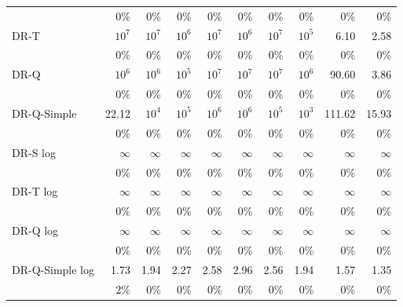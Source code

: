\begin{tabular}{l|rrrrrrrrr}
 & \scriptsize 0\% & \scriptsize 0\% & \scriptsize 0\% & \scriptsize 0\% & \scriptsize 0\% & \scriptsize 0\% & \scriptsize 0\% & \scriptsize 0\% & \scriptsize 0\% \\[2pt]
DR-T & $10^{7}$ & $10^{7}$ & $10^{6}$ & $10^{7}$ & $10^{6}$ & $10^{7}$ & $10^{5}$ & 6.10 & 2.58 \\
 & \scriptsize 0\% & \scriptsize 0\% & \scriptsize 0\% & \scriptsize 0\% & \scriptsize 0\% & \scriptsize 0\% & \scriptsize 0\% & \scriptsize 0\% & \scriptsize 0\% \\[2pt]
DR-Q & $10^{6}$ & $10^{6}$ & $10^{5}$ & $10^{7}$ & $10^{7}$ & $10^{7}$ & $10^{6}$ & 90.60 & 3.86 \\
 & \scriptsize 0\% & \scriptsize 0\% & \scriptsize 0\% & \scriptsize 0\% & \scriptsize 0\% & \scriptsize 0\% & \scriptsize 0\% & \scriptsize 0\% & \scriptsize 0\% \\[2pt]
DR-Q-Simple & 22.12 & $10^{4}$ & $10^{5}$ & $10^{6}$ & $10^{6}$ & $10^{5}$ & $10^{3}$ & 111.62 & 15.93 \\
 & \scriptsize 0\% & \scriptsize 0\% & \scriptsize 0\% & \scriptsize 0\% & \scriptsize 0\% & \scriptsize 0\% & \scriptsize 0\% & \scriptsize 0\% & \scriptsize 0\% \\[2pt]
\hline
DR-S log & $\infty$ & $\infty$ & $\infty$ & $\infty$ & $\infty$ & $\infty$ & $\infty$ & $\infty$ & $\infty$ \\
 & \scriptsize 0\% & \scriptsize 0\% & \scriptsize 0\% & \scriptsize 0\% & \scriptsize 0\% & \scriptsize 0\% & \scriptsize 0\% & \scriptsize 0\% & \scriptsize 0\% \\[2pt]
DR-T log & $\infty$ & $\infty$ & $\infty$ & $\infty$ & $\infty$ & $\infty$ & $\infty$ & $\infty$ & $\infty$ \\
 & \scriptsize 0\% & \scriptsize 0\% & \scriptsize 0\% & \scriptsize 0\% & \scriptsize 0\% & \scriptsize 0\% & \scriptsize 0\% & \scriptsize 0\% & \scriptsize 0\% \\[2pt]
DR-Q log & $\infty$ & $\infty$ & $\infty$ & $\infty$ & $\infty$ & $\infty$ & $\infty$ & $\infty$ & $\infty$ \\
 & \scriptsize 0\% & \scriptsize 0\% & \scriptsize 0\% & \scriptsize 0\% & \scriptsize 0\% & \scriptsize 0\% & \scriptsize 0\% & \scriptsize 0\% & \scriptsize 0\% \\[2pt]
DR-Q-Simple log & 1.73 & 1.94 & 2.27 & 2.58 & 2.96 & 2.56 & 1.94 & 1.57 & 1.35 \\
 & \scriptsize 2\% & \scriptsize 0\% & \scriptsize 0\% & \scriptsize 0\% & \scriptsize 0\% & \scriptsize 0\% & \scriptsize 0\% & \scriptsize 0\% & \scriptsize 0\% \\[2pt]

\end{tabular}
